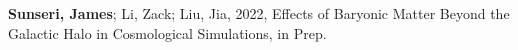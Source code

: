 \item \textbf{Sunseri, James}; Li, Zack; Liu, Jia, 2022, {Effects of Baryonic Matter Beyond the Galactic Halo in Cosmological Simulations}, in Prep.